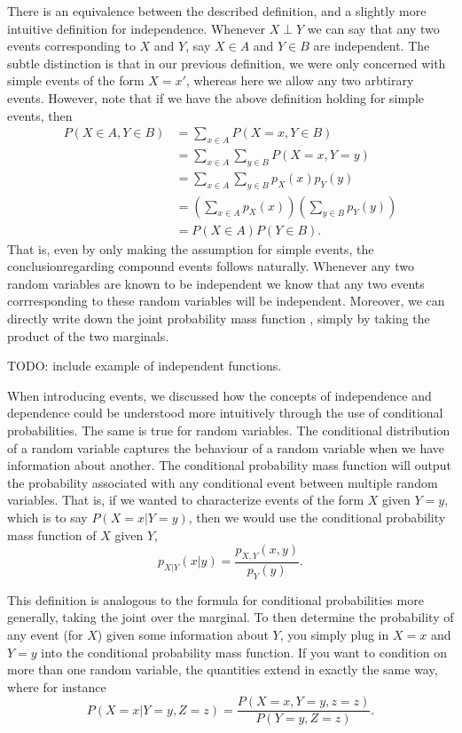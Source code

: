 \documentclass[
  letterpaper,
  DIV=11,
  numbers=noendperiod]{scrreprt}
\begin{document}
There is an equivalence between the described definition, and a slightly
more intuitive definition for independence. Whenever \(X\perp Y\) we can
say that any two events corresponding to \(X\) and \(Y\), say
\(X \in A\) and \(Y \in B\) are independent. The subtle distinction is
that in our previous definition, we were only concerned with simple
events of the form \(X=x'\), whereas here we allow any two arbtirary
events. However, note that if we have the above definition holding for
simple events, then \begin{align*}
P(X \in A, Y \in B) &= \sum_{x\in A}P(X=x,Y\in B) \\
&= \sum_{x\in A}\sum_{y \in B} P(X=x,Y=y)\\
&= \sum_{x\in A}\sum_{y \in B} p_X(x)p_Y(y) \\
&= \left(\sum_{x\in A}p_X(x)\right)\left(\sum_{y\in B}p_Y(y)\right)\\
&= P(X\in A)P(Y\in B).
\end{align*} That is, even by only making the assumption for simple
events, the conclusionregarding compound events follows naturally.
Whenever any two random variables are known to be independent we know
that any two events corrresponding to these random variables will be
independent. Moreover, we can directly write down the joint probability
mass function , simply by taking the product of the two marginals.

TODO: include example of independent functions.

When introducing events, we discussed how the concepts of independence
and dependence could be understood more intuitively through the use of
conditional probabilities. The same is true for random variables. The
conditional distribution of a random variable captures the behaviour of
a random variable when we have information about another. The
conditional probability mass function will output the probability
associated with any conditional event between multiple random variables.
That is, if we wanted to characterize events of the form \(X\) given
\(Y=y\), which is to say \(P(X=x|Y=y)\), then we would use the
conditional probability mass function of \(X\) given \(Y\),
\[p_{X|Y}(x|y) = \frac{p_{X,Y}(x,y)}{p_Y(y)}.\]

This definition is analogous to the formula for conditional
probabilities more generally, taking the joint over the marginal. To
then determine the probability of any event (for \(X\)) given some
information about \(Y\), you simply plug in \(X=x\) and \(Y=y\) into the
conditional probability mass function. If you want to condition on more
than one random variable, the quantities extend in exactly the same way,
where for instance \[P(X=x|Y=y,Z=z)=\frac{P(X=x,Y=y,z=z)}{P(Y=y,Z=z)}.\]
\end{document}
